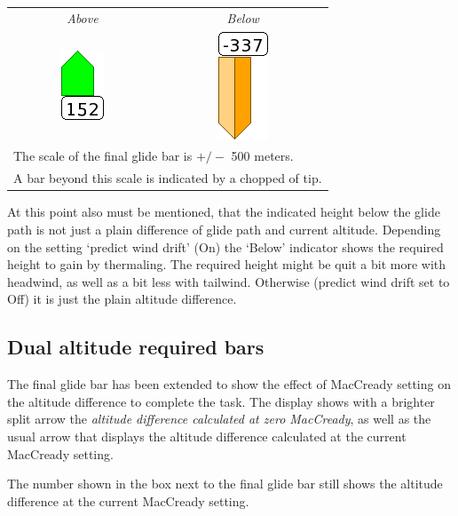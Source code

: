 \begin{center}
\begin{tabular}{c c}
{\it Above} & {\it Below} \\
\includegraphics[angle=0,keepaspectratio='true']{figures/cut-fg-above.png} &
\includegraphics[angle=0,keepaspectratio='true']{figures/cut-fg-below.png} \\
\multicolumn{2}{l}{The scale of the final glide bar is $+/-$ 500 meters.} \\
\multicolumn{2}{l}{A bar beyond this scale is indicated by a chopped of tip.}
\end{tabular}
\end{center}
\tip
At this point also must be mentioned, that the indicated height below the glide 
path is not just a plain difference of glide path and current altitude. Depending 
on the setting `predict wind drift' (On) the `Below' indicator 
shows the required height to gain by thermaling. 
The required height might be quit a bit more with headwind, as well as a bit less 
with tailwind. 
Otherwise (predict wind drift set to Off) it is just the plain 
altitude difference.



\subsection*{Dual altitude required bars}

The final glide bar has been extended to show the effect of MacCready
setting on the altitude difference to complete the task.  The display
shows with a brighter split arrow the {\em altitude difference calculated at zero
MacCready}, as well as the usual arrow that displays the
altitude difference calculated at the current MacCready setting.

The number shown in the box next to the final glide bar still shows
the altitude difference at the current MacCready setting.

